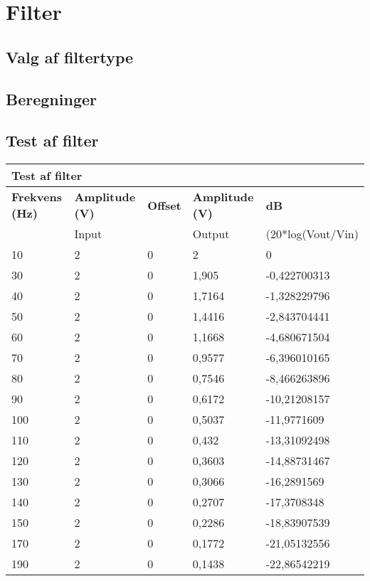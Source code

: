 \section{Filter}
\subsection{Valg af filtertype}
\subsection{Beregninger}
\subsection{Test af filter}
\vspace{0.5 cm}
\begin{table}[h!]
	\begin{tabular}{l|l|l|l|l}
		\multicolumn{5}{l}{\textbf{Test af filter}} \\
		\hline
		\textbf{Frekvens (Hz)} & \textbf{Amplitude (V)} & \textbf{Offset} & \textbf{Amplitude (V)} & \textbf{dB} \\
		& Input &  & Output & (20*log(Vout/Vin) \\
		\hline
		10 & 2 & 0 & 2 & 0 \\
		\hline
		30 & 2 & 0 & 1,905 & -0,422700313 \\
		\hline
		40 & 2 & 0 & 1,7164 & -1,328229796 \\
		\hline
		50 & 2 & 0 & 1,4416 & -2,843704441 \\
		\hline
		60 & 2 & 0 & 1,1668 & -4,680671504 \\
		\hline
		70 & 2 & 0 & 0,9577 & -6,396010165 \\
		\hline
		80 & 2 & 0 & 0,7546 & -8,466263896 \\
		\hline
		90 & 2 & 0 & 0,6172 & -10,21208157 \\
		\hline
		100 & 2 & 0 & 0,5037 & -11,9771609 \\
		\hline
		110 & 2 & 0 & 0,432 & -13,31092498 \\
		\hline
		120 & 2 & 0 & 0,3603 & -14,88731467 \\
		\hline
		130 & 2 & 0 & 0,3066 & -16,2891569 \\
		\hline
		140 & 2 & 0 & 0,2707 & -17,3708348 \\
		\hline
		150 & 2 & 0 & 0,2286 & -18,83907539 \\
		\hline
		170 & 2 & 0 & 0,1772 & -21,05132556 \\
		\hline
		190 & 2 & 0 & 0,1438 & -22,86542219 \\

\end{tabular}
\end{table}
